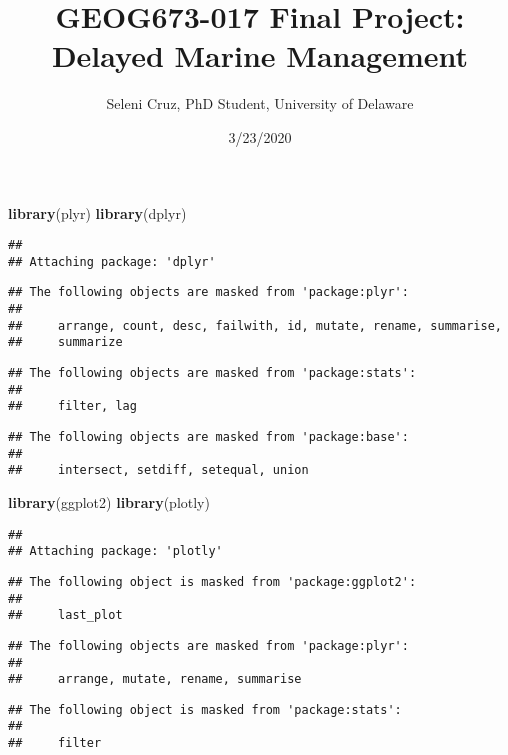 \documentclass[
]{article}
\title{GEOG673-017 Final Project: Delayed Marine Management}
\author{Seleni Cruz, PhD Student, University of Delaware}
\date{3/23/2020}
\newenvironment{Shaded}{\begin{snugshade}}{\end{snugshade}}
\newcommand{\KeywordTok}[1]{\textcolor[rgb]{0.13,0.29,0.53}{\textbf{#1}}}
\newcommand{\NormalTok}[1]{#1}
\begin{document}
\maketitle

\begin{Shaded}
\begin{Highlighting}[]
\KeywordTok{library}\NormalTok{(plyr)}
\KeywordTok{library}\NormalTok{(dplyr)}
\end{Highlighting}
\end{Shaded}

\begin{verbatim}
## 
## Attaching package: 'dplyr'
\end{verbatim}

\begin{verbatim}
## The following objects are masked from 'package:plyr':
## 
##     arrange, count, desc, failwith, id, mutate, rename, summarise,
##     summarize
\end{verbatim}

\begin{verbatim}
## The following objects are masked from 'package:stats':
## 
##     filter, lag
\end{verbatim}

\begin{verbatim}
## The following objects are masked from 'package:base':
## 
##     intersect, setdiff, setequal, union
\end{verbatim}

\begin{Shaded}
\begin{Highlighting}[]
\KeywordTok{library}\NormalTok{(ggplot2)}
\KeywordTok{library}\NormalTok{(plotly)}
\end{Highlighting}
\end{Shaded}

\begin{verbatim}
## 
## Attaching package: 'plotly'
\end{verbatim}

\begin{verbatim}
## The following object is masked from 'package:ggplot2':
## 
##     last_plot
\end{verbatim}

\begin{verbatim}
## The following objects are masked from 'package:plyr':
## 
##     arrange, mutate, rename, summarise
\end{verbatim}

\begin{verbatim}
## The following object is masked from 'package:stats':
## 
##     filter
\end{verbatim}
\end{document}
